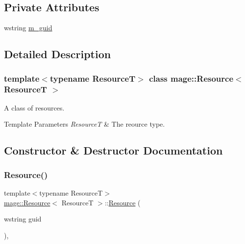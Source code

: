 \subsection*{Private Attributes}
\begin{DoxyCompactItemize}
\item 
wstring \mbox{\hyperlink{classmage_1_1_resource_ac8cf21b8b48c47a104110e12e259ad99}{m\+\_\+guid}}
\end{DoxyCompactItemize}


\subsection{Detailed Description}
\subsubsection*{template$<$typename ResourceT$>$\newline
class mage\+::\+Resource$<$ Resource\+T $>$}

A class of resources.


\begin{DoxyTemplParams}{Template Parameters}
{\em ResourceT} & The reource type. \\
\hline
\end{DoxyTemplParams}


\subsection{Constructor \& Destructor Documentation}
\mbox{\label{classmage_1_1_resource_a397a81a1195dea231776db9787cad52d}} 
\subsubsection{\texorpdfstring{Resource()}{Resource()}\hspace{0.1cm}{\footnotesize\ttfamily [1/3]}}
{\footnotesize\ttfamily template$<$typename ResourceT$>$ \\
\mbox{\hyperlink{classmage_1_1_resource}{mage\+::\+Resource}}$<$ ResourceT $>$\+::\mbox{\hyperlink{classmage_1_1_resource}{Resource}} (\begin{DoxyParamCaption}\item[{wstring}]{guid }\end{DoxyParamCaption})\hspace{0.3cm}{\ttfamily [explicit]}, {\ttfamily [noexcept]}}

